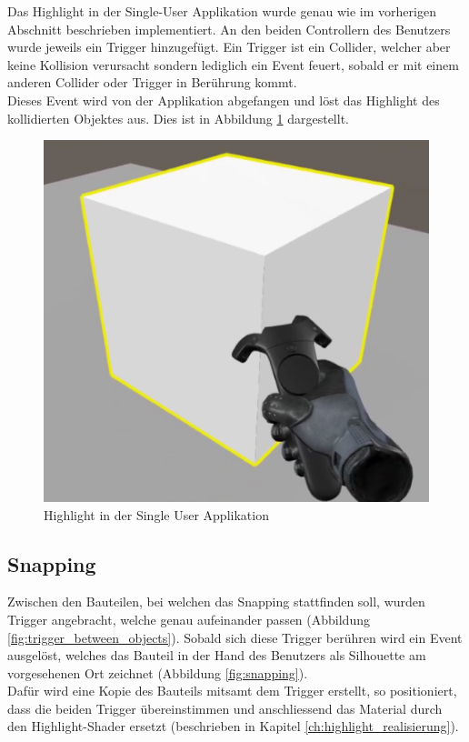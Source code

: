 \noindent Das Highlight in der Single-User Applikation wurde genau wie im vorherigen Abschnitt beschrieben implementiert. An den beiden Controllern des Benutzers wurde jeweils ein Trigger hinzugefügt. Ein Trigger ist ein Collider, welcher aber keine Kollision verursacht sondern lediglich ein Event feuert, sobald er mit einem anderen Collider oder Trigger in Berührung kommt. \\
Dieses Event wird von der Applikation abgefangen und löst das Highlight des kollidierten Objektes aus. Dies ist in Abbildung \ref{fig:highlight_single_user_application} dargestellt.

\begin{figure}[h!]
	\centering
	\includegraphics[keepaspectratio,width=0.4\linewidth]{img/Single_User_Highlight.PNG}
	\caption{Highlight in der Single User Applikation}
	\label{fig:highlight_single_user_application}
\end{figure}

\subsection{Snapping}
\label{ch:snapping}
Zwischen den Bauteilen, bei welchen das Snapping stattfinden soll, wurden Trigger angebracht, welche genau aufeinander passen (Abbildung \ref{fig:trigger_between_objects}). Sobald sich diese Trigger berühren wird ein Event ausgelöst, welches das Bauteil in der Hand des Benutzers als Silhouette am vorgesehenen Ort zeichnet (Abbildung \ref{fig:snapping}). \\
Dafür wird eine Kopie des Bauteils mitsamt dem Trigger erstellt, so positioniert, dass die beiden Trigger übereinstimmen und anschliessend das Material durch den Highlight-Shader ersetzt (beschrieben in Kapitel \ref{ch:highlight_realisierung}).

